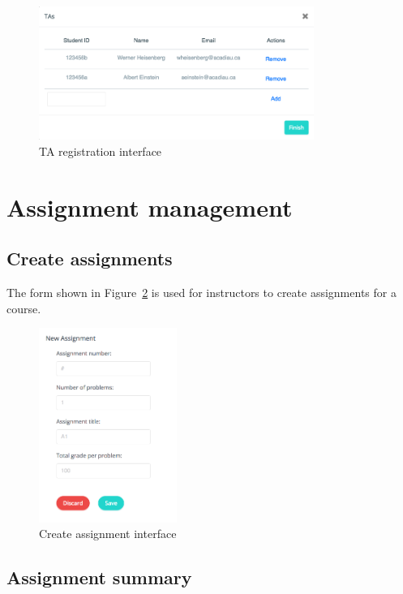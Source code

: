 \begin{figure}[ht]
    \centering
        \includegraphics[width=0.8\textwidth]{figures/reg-ta}
    \caption{TA registration interface}
    \label{fig:REG_TA}
\end{figure}


\section{Assignment management}

\subsection{Create assignments}
The form shown in Figure~\ref{fig:NEW_ASM} is used for instructors to create
assignments for a course.

\begin{figure}[ht]
    \centering
        \includegraphics[width=0.4\textwidth]{figures/create-asm}
    \caption{Create assignment interface}
    \label{fig:NEW_ASM}
\end{figure}

\subsection{Assignment summary}

